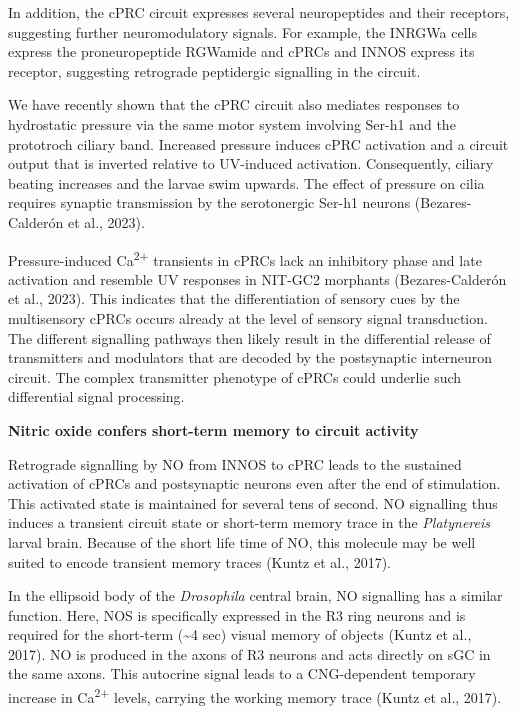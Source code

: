 \documentclass[
  10pt,
  onecolumn]{article}
\begin{document}
In addition, the cPRC circuit expresses several neuropeptides and their
receptors, suggesting further neuromodulatory signals. For example, the
INRGWa cells express the proneuropeptide RGWamide and cPRCs and INNOS
express its receptor, suggesting retrograde peptidergic signalling in
the circuit.

We have recently shown that the cPRC circuit also mediates responses to
hydrostatic pressure via the same motor system involving Ser-h1 and the
prototroch ciliary band. Increased pressure induces cPRC activation and
a circuit output that is inverted relative to UV-induced activation.
Consequently, ciliary beating increases and the larvae swim upwards. The
effect of pressure on cilia requires synaptic transmission by the
serotonergic Ser-h1 neurons (Bezares-Calderón et al., 2023).

Pressure-induced Ca\textsuperscript{2+} transients in cPRCs lack an
inhibitory phase and late activation and resemble UV responses in
NIT-GC2 morphants (Bezares-Calderón et al., 2023). This indicates that
the differentiation of sensory cues by the multisensory cPRCs occurs
already at the level of sensory signal transduction. The different
signalling pathways then likely result in the differential release of
transmitters and modulators that are decoded by the postsynaptic
interneuron circuit. The complex transmitter phenotype of cPRCs could
underlie such differential signal processing.

\textbf{Nitric oxide confers short-term memory to circuit activity}

Retrograde signalling by NO from INNOS to cPRC leads to the sustained
activation of cPRCs and postsynaptic neurons even after the end of
stimulation. This activated state is maintained for several tens of
second. NO signalling thus induces a transient circuit state or
short-term memory trace in the \emph{Platynereis} larval brain. Because
of the short life time of NO, this molecule may be well suited to encode
transient memory traces (Kuntz et al., 2017).

In the ellipsoid body of the \emph{Drosophila} central brain, NO
signalling has a similar function. Here, NOS is specifically expressed
in the R3 ring neurons and is required for the short-term
(\textasciitilde4 sec) visual memory of objects (Kuntz et al., 2017). NO
is produced in the axons of R3 neurons and acts directly on sGC in the
same axons. This autocrine signal leads to a CNG-dependent temporary
increase in Ca\textsuperscript{2+} levels, carrying the working memory
trace (Kuntz et al., 2017).
\end{document}
